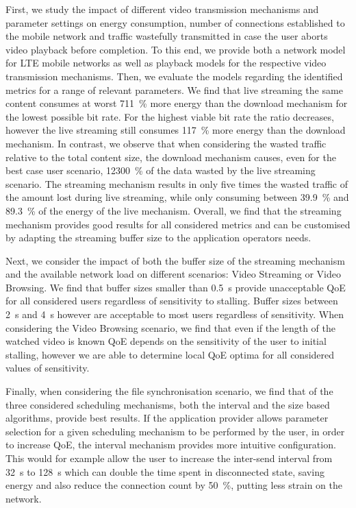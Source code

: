 First, we study the impact of different video transmission mechanisms and parameter settings on energy consumption, number of connections established to the mobile network and traffic wastefully transmitted in case the user aborts video playback before completion.
To this end, we provide both a network model for \gls{LTE} mobile networks as well as playback models for the respective video transmission mechanisms.
Then, we evaluate the models regarding the identified metrics for a range of relevant parameters.
We find that live streaming the same content consumes at worst \SI{711}{\percent} more energy than the download mechanism for the lowest possible bit rate. For the highest viable bit rate the ratio decreases, however the live streaming still consumes \SI{117}{\percent} more energy than the download mechanism.
In contrast, we observe that when considering the wasted traffic relative to the total content size, the download mechanism causes, even for the best case user scenario, \SI{12300}{\percent} of the data wasted by the live streaming scenario.
The streaming mechanism results in only five times the wasted traffic of the amount lost during live streaming, while only consuming between \SI{39.9}{\percent} and \SI{89.3}{\percent} of the energy of the live mechanism.	
Overall, we find that the streaming mechanism provides good results for all considered metrics and can be customised by adapting the streaming buffer size to the application operators needs. 

Next, we consider the impact of both the buffer size of the streaming mechanism and the available network load on different scenarios: Video Streaming or Video Browsing.
We find that buffer sizes smaller than \SI{0.5}{\second} provide unacceptable \gls{QoE} for all considered users regardless of sensitivity to stalling.
Buffer sizes between \SI{2}{\second} and \SI{4}{\second} however are acceptable to most users regardless of sensitivity.
When considering the Video Browsing scenario, we find that even if the length of the watched video is known \gls{QoE} depends on the sensitivity of the user to initial stalling, however we are able to determine local \gls{QoE} optima for all considered values of sensitivity.

Finally, when considering the file synchronisation scenario, we find that of the three considered scheduling mechanisms, both the interval and the size based algorithms, provide best results.
If the application provider allows parameter selection for a given scheduling mechanism to be performed by the user, in order to increase \gls{QoE}, the interval mechanism provides more intuitive configuration.
This would for example allow the user to increase the inter-send interval from \SI{32}{\second} to \SI{128}{\second} which can double the time spent in disconnected state, saving energy and also reduce the connection count by \SI{50}{\percent}, putting less strain on the network.


